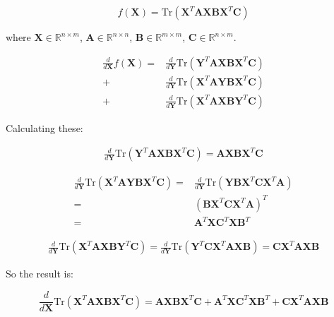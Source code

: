 \documentclass{article}
\begin{document}
\begin{appendices}
\[
f(\mathbf{X}) = \text{Tr}(\mathbf{X}^T \mathbf{A} \mathbf{X} \mathbf{B} \mathbf{X}^T \mathbf{C})
\]

where $\mathbf{X} \in \mathbb{R}^{n\times m}$, $\mathbf{A} \in \mathbb{R}^{n\times n}$, $\mathbf{B} \in \mathbb{R}^{m\times m}$, $\mathbf{C} \in \mathbb{R}^{n\times m}$.

\[
\begin{split}
    \frac{d}{d\mathbf{X}} f(\mathbf{X}) =& \frac{d}{d\mathbf{Y}} \text{Tr}(\mathbf{Y}^T \mathbf{A} \mathbf{X} \mathbf{B} \mathbf{X}^T \mathbf{C})\\
    +& \frac{d}{d\mathbf{Y}} \text{Tr}(\mathbf{X}^T \mathbf{A} \mathbf{Y} \mathbf{B} \mathbf{X}^T \mathbf{C})\\
    +& \frac{d}{d\mathbf{Y}} \text{Tr}(\mathbf{X}^T \mathbf{A} \mathbf{X} \mathbf{B} \mathbf{Y}^T \mathbf{C})
\end{split}
\]

Calculating these:

\[
\begin{split}
    \frac{d}{d\mathbf{Y}} \text{Tr}(\mathbf{Y}^T \mathbf{A} \mathbf{X} \mathbf{B} \mathbf{X}^T \mathbf{C}) = \mathbf{A} \mathbf{X} \mathbf{B} \mathbf{X}^T \mathbf{C}
\end{split}
\]

\[
\begin{split}
    \frac{d}{d\mathbf{Y}} \text{Tr}(\mathbf{X}^T \mathbf{A} \mathbf{Y} \mathbf{B} \mathbf{X}^T \mathbf{C}) =& \frac{d}{d\mathbf{Y}} \text{Tr}(\mathbf{Y} \mathbf{B} \mathbf{X}^T \mathbf{C} \mathbf{X}^T \mathbf{A})\\
    =& (\mathbf{B} \mathbf{X}^T \mathbf{C} \mathbf{X}^T \mathbf{A})^T\\
    =& \mathbf{A}^T \mathbf{X} \mathbf{C}^T \mathbf{X} \mathbf{B}^T
\end{split}
\]

\[
\begin{split}
   \frac{d}{d\mathbf{Y}} \text{Tr}(\mathbf{X}^T \mathbf{A} \mathbf{X} \mathbf{B} \mathbf{Y}^T \mathbf{C}) = \frac{d}{d\mathbf{Y}} \text{Tr}(\mathbf{Y}^T \mathbf{C} \mathbf{X}^T \mathbf{A} \mathbf{X} \mathbf{B}) = \mathbf{C} \mathbf{X}^T \mathbf{A} \mathbf{X} \mathbf{B}
\end{split}
\]

So the result is:

\[
\frac{d}{d\mathbf{X}} \text{Tr}(\mathbf{X}^T \mathbf{A} \mathbf{X} \mathbf{B} \mathbf{X}^T \mathbf{C}) = \mathbf{A} \mathbf{X} \mathbf{B} \mathbf{X}^T \mathbf{C} + \mathbf{A}^T \mathbf{X} \mathbf{C}^T \mathbf{X} \mathbf{B}^T + \mathbf{C} \mathbf{X}^T \mathbf{A} \mathbf{X} \mathbf{B}
\]



\end{appendices}
\end{document}
